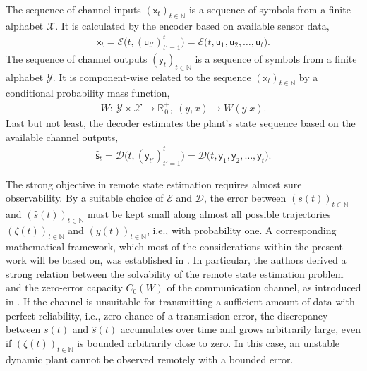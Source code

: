 \documentclass[conference]{IEEEtran}
\newcommand{\rx}{\mathsf{x}}
\newcommand{\ry}{\mathsf{y}}
\newcommand{\rs}{\mathsf{s}}
\newcommand{\ru}{\mathsf{u}}
\def\E{{\mathcal E}}
\def\D{{\mathcal D}}
\def\X{{\mathcal X}}
\def\Y{{\mathcal Y}}
\def\NN{{\mathbb N}}
\def\RR{{\mathbb R}}
\begin{document}
	The sequence of channel inputs \((\rx_t)_{t\in\NN}\) is a sequence
	of symbols from a finite alphabet \(\X\). It is calculated by the encoder based on available sensor data,
	\begin{align*}	\rx_t   = \E \big(t, (\ru_{t'})_{t'=1}^{t}\big) 
							= \E\big(t, \ru_1,\ru_2,\ldots,\ru_t\big).
	\end{align*} 
	The sequence of channel outputs \((\ry_t)_{t\in\NN}\) is a sequence
	of symbols from a finite alphabet \(\Y\). It is component-wise related to the sequence \((\rx_t)_{t\in\NN}\) by a conditional probability mass function,
	\begin{align*}	W :~ \Y \times \X \rightarrow \RR_{\hspace{1pt}0}^+,~(y,x) \mapsto W(y|x).
	\end{align*}
	Last but not least, the decoder estimates the plant's state sequence based on the available channel outputs,
	\begin{align*}	\hat{\rs}_t  	= \D \big(t, (\ry_{t'})_{t'=1}^{t}\big)  
									= \D\big(t,\ry_1,\ry_2,\ldots,\ry_t\big).
	\end{align*}

	The strong objective in remote state estimation requires almost sure observability. By a suitable choice of \(\E\) and \(\D\), the error between \((s(t))_{t\in\NN}\)
	and \((\hat{s}(t))_{t\in\NN}\) must be kept small along almost all possible trajectories \((\zeta(t))_{t\in\NN}\) and \((y(t))_{t\in\NN}\), i.e., with probability one.
	A corresponding mathematical framework, which most of the considerations within the present work will be based on, was established in \cite{MS07}.
	In particular, the authors derived a strong relation between the solvability of the remote state estimation problem and the zero-error capacity \(C_0(W)\) of the 
	communication channel, as introduced in \cite{Sh56}. If the channel is unsuitable for transmitting a sufficient amount of data with perfect reliability, i.e., zero 
	chance of a transmission error, the discrepancy between \(s(t)\) and \(\hat{s}(t)\) accumulates over time and grows arbitrarily large, even if \((\zeta(t))_{t\in\NN}\) 
	is bounded arbitrarily close to zero. In this case, an unstable dynamic plant cannot be observed remotely with a bounded error. 
\end{document}

